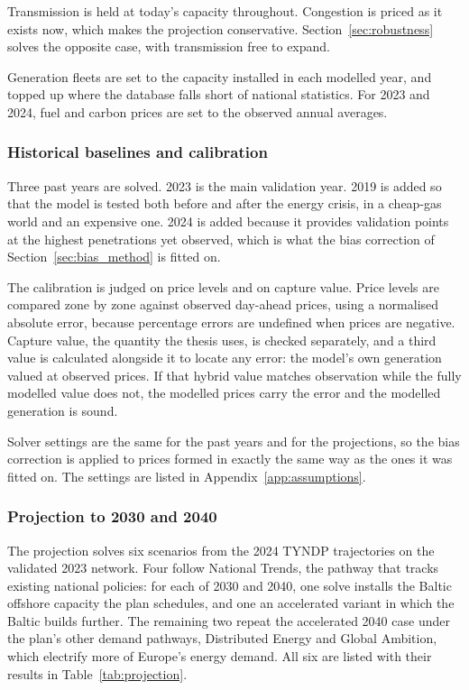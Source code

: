 Transmission is held at today's capacity throughout. Congestion is
priced as it exists now, which
makes the projection conservative. Section~\ref{sec:robustness} solves the
opposite case, with transmission free to expand.

Generation fleets are set to the capacity installed in each modelled
year, and topped up where the database falls short of national statistics. For
2023 and 2024, fuel and carbon prices are set to the observed annual
averages.

\subsubsection{Historical baselines and calibration}
\label{sec:calibration_method}

Three past years are solved. 2023 is the main validation year. 2019 is added so
that the model is tested both before and after the energy crisis, in a cheap-gas
world and an expensive one. 2024 is added because it provides validation points
at the highest penetrations yet observed, which is what the bias correction of
Section~\ref{sec:bias_method} is fitted on.

The calibration is judged on price levels and on capture value. Price levels
are compared zone by zone against observed
day-ahead prices, using a normalised absolute error, because percentage errors
are undefined when prices are negative. Capture value, the quantity the thesis
uses, is checked separately, and a third value is calculated alongside it to
locate any error: the model's own generation valued at observed prices. If that
hybrid value matches observation while the fully modelled value does not, the
modelled prices carry the error and the modelled generation is sound.

Solver settings are the same for the past years and for the projections, so the
bias correction is applied to prices formed in exactly the same way as the ones
it was fitted on. The settings are listed in Appendix~\ref{app:assumptions}.

\subsubsection{Projection to 2030 and 2040}\label{sec:projection}

The projection solves six scenarios from the 2024 TYNDP trajectories on the
validated 2023 network. Four follow National Trends, the pathway that tracks
existing national policies: for each of 2030 and 2040, one solve installs the
Baltic offshore capacity the plan schedules, and one an accelerated variant in
which the Baltic builds further. The remaining two repeat the accelerated 2040
case under the plan's other demand pathways, Distributed Energy and Global
Ambition, which electrify more of Europe's energy demand. All six are listed
with their results in Table~\ref{tab:projection}.

